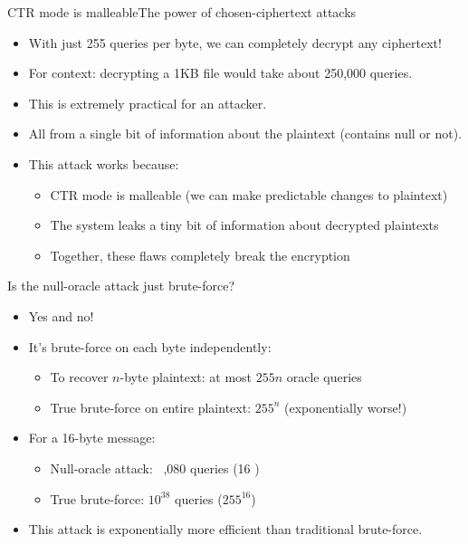 \documentclass[aspectratio=169, lualatex, handout]{beamer}
\begin{document}
\begin{frame}{CTR mode is malleable}{The power of chosen-ciphertext attacks}
	\begin{itemize}[<+->]
		\item With just 255 queries per byte, we can completely decrypt any ciphertext!
		\item For context: decrypting a 1KB file would take about 250,000 queries.
		\item This is extremely practical for an attacker.
		\item All from a single bit of information about the plaintext (contains null or not).
		\item This attack works because:
		      \begin{itemize}
			      \item CTR mode is malleable (we can make predictable changes to plaintext)
			      \item The system leaks a tiny bit of information about decrypted plaintexts
			      \item Together, these flaws completely break the encryption
		      \end{itemize}
	\end{itemize}
\end{frame}

\begin{frame}{Is the null-oracle attack just brute-force?}
	\begin{itemize}[<+->]
		\item Yes and no!
		\item It's brute-force on each byte independently:
		      \begin{itemize}
			      \item To recover $n$-byte plaintext: at most $255n$ oracle queries
			      \item True brute-force on entire plaintext: $255^n$ (exponentially worse!)
		      \end{itemize}
		\item For a 16-byte message:
		      \begin{itemize}
			      \item Null-oracle attack: ~\approx,080 queries (16 )
			      \item True brute-force: \approx$10^{38}$ queries ($255^{16}$)
		      \end{itemize}
		\item This attack is exponentially more efficient than traditional brute-force.
	\end{itemize}
\end{frame}
\end{document}
